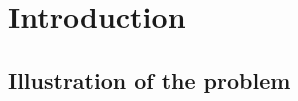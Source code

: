 \documentclass[MS,]{iitmdiss}
\title{\mythesistitle}
\author{\myname}
\date{\MakeUppercase
  {\mysubmissionmonth}}
\begin{document}
\nocite{*}
\maketitle

\begin{singlespace}
\tableofcontents
\thispagestyle{empty}
\listoftables
{}
\listoffigures
{}
\end{singlespace}

\setcounter{page}{0}


\chapter{Introduction}
\label{chap:intro}


\section{Illustration of the problem}
\label{sec:problem}







\def \LLL {{\em ``$\mathbb{B}$rief Interviews with Hideous Men''}}
\def \GGG {{\em ``The String $\mathbb{T}$heory''}} 
\def \BBB {{\em ``[$\mathbb{W}$]Rhetoric and the Math Melodrama''}}
\def \TTT {{\em ``$\mathbb{F}$ate, Time, and Language: An Essay on Free Will''}}
\end{document}
